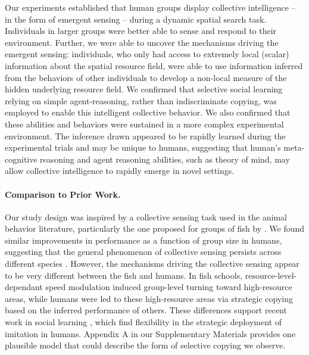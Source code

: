 \documentclass[12pt,letterpaper]{article}
\begin{document}
Our experiments established that human groups display collective intelligence -- in the form of emergent sensing -- during a dynamic spatial search task.
Individuals in larger groups were better able to sense and respond to their environment.
Further, we were able to uncover the mechanisms driving the emergent sensing:
individuals, who only had access to extremely local (scalar) information about the spatial resource field,  were able to use information inferred from the behaviors of other individuals to develop a non-local measure of the hidden underlying resource field. We confirmed that selective social learning relying on simple agent-reasoning, rather than indiscriminate copying, was employed to enable this intelligent collective behavior. We also confirmed that these abilities and behaviors were sustained in a more complex experimental environment.
The inference drawn appeared to be rapidly learned during the experimental trials and may be unique to humans, suggesting that human's meta-cognitive reasoning and agent reasoning abilities, such as theory of mind, may allow collective intelligence to rapidly emerge in novel settings.


\paragraph{Comparison to Prior Work.}

Our study design was inspired by a collective sensing task used in the animal behavior literature, particularly the one proposed for groups of fish by . 
We found similar improvements in performance as a function of group size in humans, suggesting that the general phenomenon of collective sensing persists across different species \cite{berdahl2018collective}.
However,  the mechanisms driving the collective sensing appear to be very different between the fish and humans. 
In fish schools, resource-level-dependant speed modulation induced group-level turning toward high-resource areas, while humans were led to these high-resource areas via strategic copying based on the inferred performance of others.
These differences support recent work in social learning \cite{wisdom_social_2013, mcelreath_beyond_2008}, which find flexibility in the strategic deployment of imitation in humans. Appendix A in our Supplementary Materials provides one plausible model that could describe the form of selective copying we observe.
\end{document}
